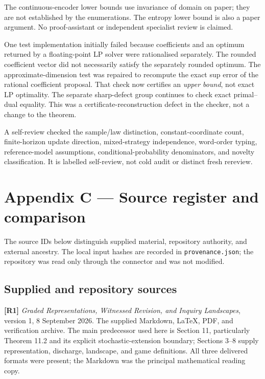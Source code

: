 \documentclass[11pt,a4paper]{article}
\begin{document}
The continuous-encoder lower bounds use invariance of domain on paper;
they are not established by the enumerations. The entropy lower bound is
also a paper argument. No proof-assistant or independent specialist
review is claimed.

One test implementation initially failed because coefficients and an
optimum returned by a floating-point LP solver were rationalised
separately. The rounded coefficient vector did not necessarily satisfy
the separately rounded optimum. The approximate-dimension test was
repaired to recompute the exact sup error of the rational coefficient
proposal. That check now certifies an \emph{upper bound}, not exact LP
optimality. The separate sharp-defect group continues to check exact
primal--dual equality. This was a certificate-reconstruction defect in
the checker, not a change to the theorem.

A self-review checked the sample/law distinction, constant-coordinate
count, finite-horizon update direction, mixed-strategy independence,
word-order typing, reference-model assumptions, conditional-probability
denominators, and novelty classification. It is labelled self-review,
not cold audit or distinct fresh rereview.

\clearpage

\section*{Appendix C --- Source register and
comparison}\label{appendix-c-source-register-and-comparison}

The source IDs below distinguish supplied material, repository
authority, and external ancestry. The local input hashes are recorded in
\texttt{provenance.json}; the repository was read only through the
connector and was not modified.

\subsection*{Supplied and repository
sources}\label{supplied-and-repository-sources}

\textbf{{[}R1{]}} \emph{Graded Representations, Witnessed Revision, and
Inquiry Landscapes}, version 1, 8 September 2026. The supplied Markdown,
LaTeX, PDF, and verification archive. The main predecessor used here is
Section 11, particularly Theorem 11.2 and its explicit
stochastic-extension boundary; Sections 3--8 supply representation,
discharge, landscape, and game definitions. All three delivered formats
were present; the Markdown was the principal mathematical reading copy.
\end{document}
